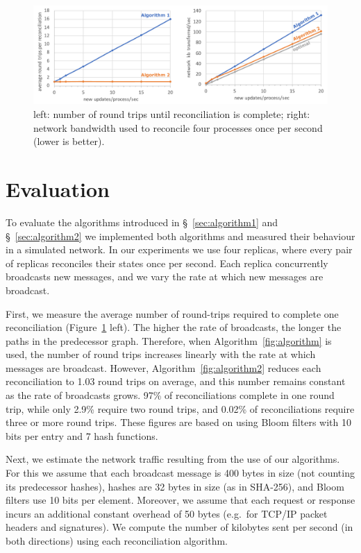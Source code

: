\documentclass[a4paper,anonymous,USenglish]{lipics-v2019}
\begin{document}
\begin{figure}
  \includegraphics[width=\textwidth,keepaspectratio=true]{figs/evaluation.pdf}
  \caption{left: number of round trips until reconciliation is complete; right: network bandwidth used to reconcile four processes once per second (lower is better).}
  \label{fig:evaluation}
\end{figure}

\section{Evaluation}\label{sec:evaluation}

To evaluate the algorithms introduced in \S~\ref{sec:algorithm1} and \S~\ref{sec:algorithm2} we implemented both algorithms and measured their behaviour in a simulated network.
In our experiments we use four replicas, where every pair of replicas reconciles their states once per second.
Each replica concurrently broadcasts new messages, and we vary the rate at which new messages are broadcast.

First, we measure the average number of round-trips required to complete one reconciliation (Figure~\ref{fig:evaluation} left).
The higher the rate of broadcasts, the longer the paths in the predecessor graph.
Therefore, when Algorithm~\ref{fig:algorithm} is used, the number of round trips increases linearly with the rate at which messages are broadcast.
However, Algorithm~\ref{fig:algorithm2} reduces each reconciliation to 1.03 round trips on average, and this number remains constant as the rate of broadcasts grows.
97\% of reconciliations complete in one round trip, while only 2.9\% require two round trips, and 0.02\% of reconciliations require three or more round trips.
These figures are based on using Bloom filters with 10 bits per entry and 7 hash functions.

Next, we estimate the network traffic resulting from the use of our algorithms.
For this we assume that each broadcast message is 400 bytes in size (not counting its predecessor hashes), hashes are 32 bytes in size (as in SHA-256), and Bloom filters use 10 bits per element.
Moreover, we assume that each request or response incurs an additional constant overhead of 50 bytes (e.g.\ for TCP/IP packet headers and signatures).
We compute the number of kilobytes sent per second (in both directions) using each reconciliation algorithm.
\end{document}
